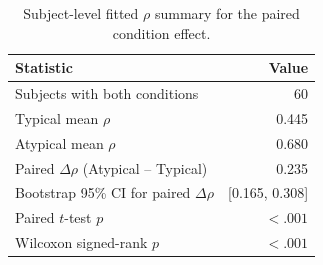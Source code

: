 \begin{table}[htbp]
\centering
\caption{Subject-level fitted $\rho$ summary for the paired condition effect.}
\label{tab:rho-subject-paired-summary}
\begin{tabular}{l r}
\toprule
Statistic & Value \\
\midrule
Subjects with both conditions & 60 \\
Typical mean $\rho$ & 0.445 \\
Atypical mean $\rho$ & 0.680 \\
Paired $\Delta\rho$ (Atypical -- Typical) & 0.235 \\
Bootstrap 95\% CI for paired $\Delta\rho$ & [0.165, 0.308] \\
Paired $t$-test $p$ & $<.001$ \\
Wilcoxon signed-rank $p$ & $<.001$ \\
\bottomrule
\end{tabular}
\end{table}
